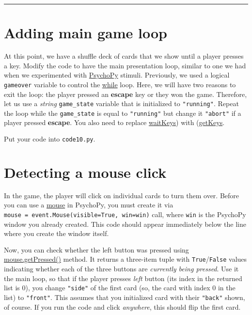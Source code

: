 \documentclass[
]{book}
\begin{document}
\begin{center}\rule{0.5\linewidth}{0.5pt}\end{center}

\hypertarget{adding-main-game-loop}{%
\section{Adding main game loop}\label{adding-main-game-loop}}

At this point, we have a shuffle deck of cards that we show until a player presses a key. Modify the code to have the main presentation loop, similar to one we had when we experimented with \protect\hyperlink{psychopy-basics}{PsychoPy} stimuli. Previously, we used a logical \texttt{gameover} variable to control the \protect\hyperlink{ux5cux23while-loop}{while} loop. Here, we will have two reasons to exit the loop: the player pressed an \textbf{escape} key or they won the game. Therefore, let us use a \emph{string} \texttt{game\_state} variable that is initialized to \texttt{"running"}. Repeat the loop while the \texttt{game\_state} is equal to \texttt{"running"} but change it \texttt{"abort"} if a player pressed \textbf{escape}. You also need to replace \href{https://psychopy.org/api/event.html\#psychopy.event.waitKeys}{waitKeys}) with (\href{https://psychopy.org/api/event.html\#psychopy.event.getKeys}{getKeys}.

Put your code into \texttt{code10.py}.

\hypertarget{psychopy-mouse}{%
\section{Detecting a mouse click}\label{psychopy-mouse}}

In the game, the player will click on individual cards to turn them over. Before you can use a \href{https://psychopy.org/api/event.html\#psychopy.event.Mouse}{mouse} in PsychoPy, you must create it via \texttt{mouse\ =\ event.Mouse(visible=True,\ win=win)} call, where \texttt{win} is the PsychoPy window you already created. This code should appear immediately below the line where you create the window itself.

Now, you can check whether the left button was pressed using \href{https://psychopy.org/api/event.html\#psychopy.event.Mouse.getPressed}{mouse.getPressed()} method. It returns a three-item tuple with \texttt{True}/\texttt{False} values indicating whether each of the three buttons are \emph{currently being pressed}. Use it the main loop, so that if the player presses \emph{left} button (its index in the returned list is 0), you change \texttt{"side"} of the first card (so, the card with index 0 in the list) to \texttt{"front"}. This assumes that you initialized card with their \texttt{"back"} shown, of course. If you run the code and click \emph{anywhere}, this should flip the first card.
\end{document}
